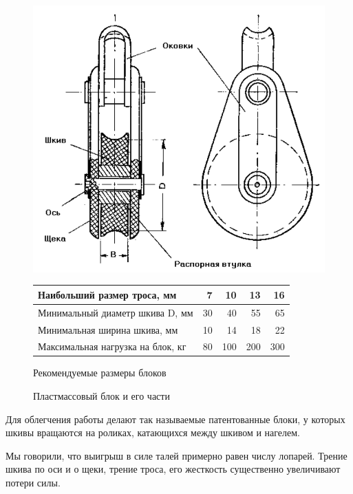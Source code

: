 \documentclass[a4paper, 12pt, twoside, final]{scrbook}
\begin{document}
\begin{figure}[htbp]
\begin{centering}
\includegraphics{Platmassovyj_blok}
\par\end{centering}

\protect\caption{\label{fig:45}Пластмассовый блок и его части}


\bigskip{}


\begin{centering}
\begin{tabular}{|l|r|r|r|r|}
\hline 
Наибольший размер троса, мм & 7 & 10 & 13 & 16\tabularnewline
\hline 
Минимальный диаметр шкива D, мм & 30 & 40 & 55 & 65\tabularnewline
\hline 
Минимальная ширина шкива, мм & 10 & 14 & 18 & 22\tabularnewline
\hline 
Максимальная нагрузка на блок, кг & 80 & 100 & 200 & 300\tabularnewline
\hline 
\end{tabular}
\par\end{centering}

\bigskip{}


\centering{}Рекомендуемые размеры блоков
\end{figure}


Для облегчения работы делают так называемые патентованные блоки, у
которых шкивы вращаются на роликах, катающихся между шкивом и нагелем.

Мы говорили, что выигрыш в силе талей примерно равен числу лопарей.
Трение шкива по оси и о щеки, трение троса, его жесткость существенно
увеличивают потери силы.
\end{document}
